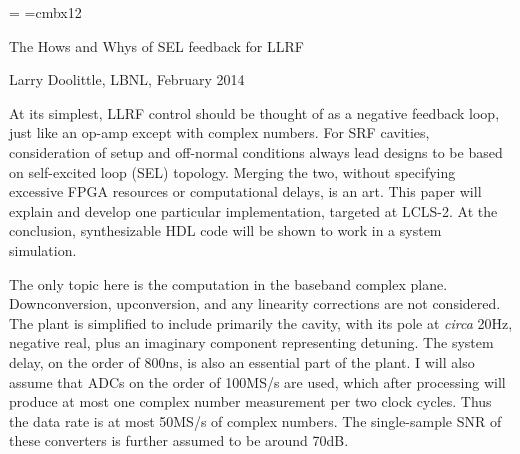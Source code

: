 \magnification=
\parindent=0pt
\parskip=6pt
\font\big=cmbx12

\newif\ifpdftex
\ifx\pdfoutput\undefined \pdftexfalse \else\ifnum\pdfoutput=0 \pdftexfalse
\else \pdftextrue \pdfoutput=1  \let\setcolor\pdfsetcolor \fi\fi

\ifpdftex
\def\centerfig#1#2{\centerline{\pdfximage width #1 {#2.pdf}\pdfrefximage\pdflastximage}}
\def\barefig#1#2{\pdfximage width #1 {#2.pdf}\pdfrefximage\pdflastximage}
\pdfpagewidth=8.5 truein
\pdfpageheight=11.0 truein
\else

\def\centerfig#1#2{\centerline{\epsfxsize=#1\epsffile{#2.eps}}}
\def\barefig#1#2{\epsfxsize=#1\epsffile{#2.eps}}
\fi


\centerline{\big The Hows and Whys of SEL feedback for LLRF}
\centerline{Larry Doolittle, LBNL, February 2014}

At its simplest, LLRF control should be thought of as a negative
feedback loop, just like an op-amp except with complex numbers.
For SRF cavities, consideration of setup and off-normal
conditions always lead designs to be based on self-excited loop
(SEL) topology.  Merging the two, without specifying excessive FPGA
resources or computational delays, is an art.  This paper will
explain and develop one particular implementation, targeted at
LCLS-2.  At the conclusion, synthesizable HDL code will be shown
to work in a system simulation.

The only topic here is the computation in the baseband complex plane.
Downconversion, upconversion, and any linearity corrections are
not considered.  The plant is simplified to include primarily the cavity,
with its pole at {\it circa} 20\thinspace Hz, negative real, plus an imaginary
component representing detuning.  The system delay, on the order of
800\thinspace ns, is also an essential part of the plant.
I will also assume that ADCs on the order of 100\thinspace MS/s are
used, which after processing will produce at most one complex number
measurement per two clock cycles.  Thus the data rate is at most
50\thinspace MS/s of complex numbers.  The single-sample SNR of these
converters is further assumed to be around 70\thinspace dB.

